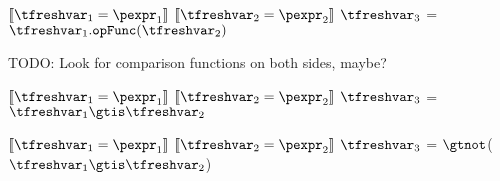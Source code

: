 \documentclass{article}
\begin{document}
\newsavebox{\compareBox}
\begin{lrbox}{\compareBox}
\begin{python}
$\meaningof{\tfreshvar_1 = \pexpr_1}$
$\meaningof{\tfreshvar_2 = \pexpr_2}$
$\tfreshvar_3$ = $\tfreshvar_1.\mathtt{opFunc}(\tfreshvar_2)$
\end{python}
\end{lrbox}

TODO: Look for comparison functions on both sides, maybe?

\begin{mathpar}
\end{mathpar}

\newsavebox{\compareIsBox}
\begin{lrbox}{\compareIsBox}
\begin{python}
$\meaningof{\tfreshvar_1 = \pexpr_1}$
$\meaningof{\tfreshvar_2 = \pexpr_2}$
$\tfreshvar_3$ = $\tfreshvar_1 \gtis \tfreshvar_2$
\end{python}
\end{lrbox}

\begin{mathpar}
\end{mathpar}

\newsavebox{\compareIsNotBox}
\begin{lrbox}{\compareIsNotBox}
\begin{python}
$\meaningof{\tfreshvar_1 = \pexpr_1}$
$\meaningof{\tfreshvar_2 = \pexpr_2}$
$\tfreshvar_3$ = $\gtnot$($\tfreshvar_1 \gtis \tfreshvar_2$)
\end{python}
\end{lrbox}

\begin{mathpar}
\end{mathpar}
\end{document}
